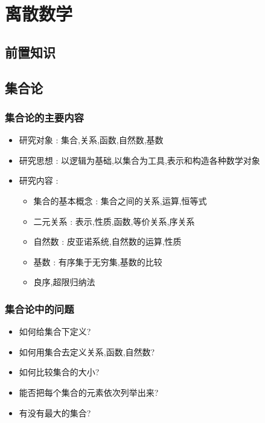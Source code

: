 \chapter{离散数学}{

\section{前置知识}

\section{集合论}{

\subsection{集合论的主要内容}{
  \begin{itemize}
    \item 研究对象 : 集合,关系,函数,自然数,基数
    \item 研究思想 : 以逻辑为基础,以集合为工具,表示和构造各种数学对象
    \item 研究内容 : \begin{itemize}
            \item 集合的基本概念 : 集合之间的关系,运算,恒等式
            \item 二元关系 : 表示,性质,函数,等价关系,序关系
            \item 自然数 : 皮亚诺系统,自然数的运算,性质
            \item 基数 : 有序集于无穷集,基数的比较
            \item 良序,超限归纳法
          \end{itemize}
  \end{itemize}
}%

\subsection{集合论中的问题}{
  \begin{itemize}
    \item 如何给集合下定义?
    \item 如何用集合去定义关系,函数,自然数?
    \item 如何比较集合的大小?
    \item 能否把每个集合的元素依次列举出来?
    \item 有没有最大的集合?
  \end{itemize}
}%

}}
